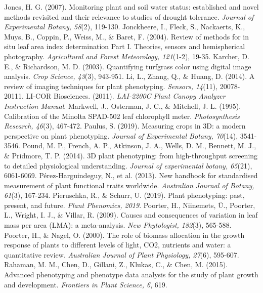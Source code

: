 \documentclass[12pt, a4paper]{article}
\begin{document}
\begin{thebibliography}{99}
		 Jones, H. G. (2007). Monitoring plant and soil water status: established and novel methods revisited and their relevance to studies of drought tolerance. \textit{Journal of Experimental Botany, 58}(2), 119-130.
		 Jonckheere, I., Fleck, S., Nackaerts, K., Muys, B., Coppin, P., Weiss, M., \& Baret, F. (2004). Review of methods for in situ leaf area index determination Part I. Theories, sensors and hemispherical photography. \textit{Agricultural and Forest Meteorology, 121}(1-2), 19-35.
		 Karcher, D. E., \& Richardson, M. D. (2003). Quantifying turfgrass color using digital image analysis. \textit{Crop Science, 43}(3), 943-951.
		 Li, L., Zhang, Q., \& Huang, D. (2014). A review of imaging techniques for plant phenotyping. \textit{Sensors, 14}(11), 20078-20111.
		 LI-COR Biosciences. (2011). \textit{LAI-2200C Plant Canopy Analyzer Instruction Manual}.
		 Markwell, J., Osterman, J. C., \& Mitchell, J. L. (1995). Calibration of the Minolta SPAD-502 leaf chlorophyll meter. \textit{Photosynthesis Research, 46}(3), 467-472.
		 Paulus, S. (2019). Measuring crops in 3D: a modern perspective on plant phenotyping. \textit{Journal of Experimental Botany, 70}(14), 3541-3546.
		 Pound, M. P., French, A. P., Atkinson, J. A., Wells, D. M., Bennett, M. J., \& Pridmore, T. P. (2014). 3D plant phenotyping: from high-throughput screening to detailed physiological understanding. \textit{Journal of experimental botany, 65}(21), 6061-6069.
		 Pérez-Harguindeguy, N., et al. (2013). New handbook for standardised measurement of plant functional traits worldwide. \textit{Australian Journal of Botany, 61}(3), 167-234.
		 Pieruschka, R., \& Schurr, U. (2019). Plant phenotyping: past, present, and future. \textit{Plant Phenomics, 2019}.
		 Poorter, H., Niinemets, Ü., Poorter, L., Wright, I. J., \& Villar, R. (2009). Causes and consequences of variation in leaf mass per area (LMA): a meta‐analysis. \textit{New Phytologist, 182}(3), 565-588.
		 Poorter, H., \& Nagel, O. (2000). The role of biomass allocation in the growth response of plants to different levels of light, CO2, nutrients and water: a quantitative review. \textit{Australian Journal of Plant Physiology, 27}(6), 595-607.
		 Rahaman, M. M., Chen, D., Gillani, Z., Klukas, C., \& Chen, M. (2015). Advanced phenotyping and phenotype data analysis for the study of plant growth and development. \textit{Frontiers in Plant Science, 6}, 619.

\end{thebibliography}
\end{document}
